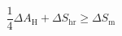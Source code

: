 \begin{equation}
\frac{1}{4} \Delta A_{\text{H}}+ \Delta S_{\text{hr}}\geq \Delta
S_{\text{m}}\,
\label{eqmgsl}
\end{equation}

